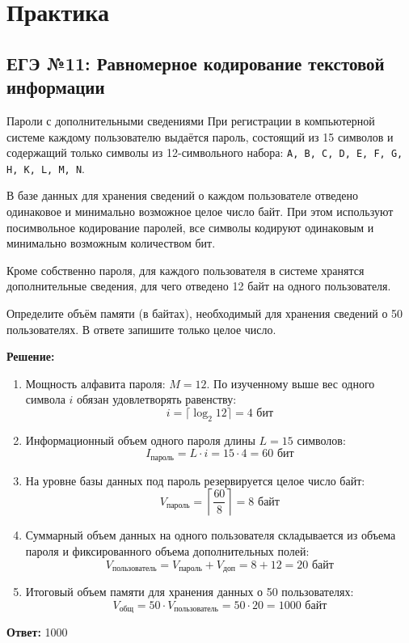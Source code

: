 \documentclass[11pt,a4paper]{article}
\begin{document}
\section{Практика}

\subsection{ЕГЭ №11: Равномерное кодирование текстовой информации}

\begin{taskbox}{Пароли с дополнительными сведениями}
При регистрации в компьютерной системе каждому пользователю выдаётся пароль, состоящий из 15 символов и содержащий только символы из 12-символьного набора: \texttt{А, В, C, D, Е, F, G, H, К, L, M, N}. 

В базе данных для хранения сведений о каждом пользователе отведено одинаковое и минимально возможное целое число байт. При этом используют посимвольное кодирование паролей, все символы кодируют одинаковым и минимально возможным количеством бит. 

Кроме собственно пароля, для каждого пользователя в системе хранятся дополнительные сведения, для чего отведено 12 байт на одного пользователя.

Определите объём памяти (в байтах), необходимый для хранения сведений о 50 пользователях. В ответе запишите только целое число.
\end{taskbox}

\textbf{Решение:}
\begin{enumerate}
    \item Мощность алфавита пароля: $M = 12$. 
    По изученному выше вес одного символа $i$ обязан удовлетворять равенству:
    $$i = \lceil \log_2 12 \rceil = 4 \text{ бит}$$
    \item Информационный объем одного пароля длины $L = 15$ символов:
    $$I_{\text{пароль}} = L \cdot i = 15 \cdot 4 = 60 \text{ бит}$$
    \item На уровне базы данных под пароль резервируется целое число байт:
    $$V_{\text{пароль}} = \left\lceil \frac{60}{8} \right\rceil = 8 \text{ байт}$$
    \item Суммарный объем данных на одного пользователя складывается из объема пароля и фиксированного объема дополнительных полей:
    $$V_{\text{пользователь}} = V_{\text{пароль}} + V_{\text{доп}} = 8 + 12 = 20 \text{ байт}$$
    \item Итоговый объем памяти для хранения данных о 50 пользователях:
    $$V_{\text{общ}} = 50 \cdot V_{\text{пользователь}} = 50 \cdot 20 = 1000 \text{ байт}$$
\end{enumerate}
\textbf{Ответ:} 1000
\end{document}
